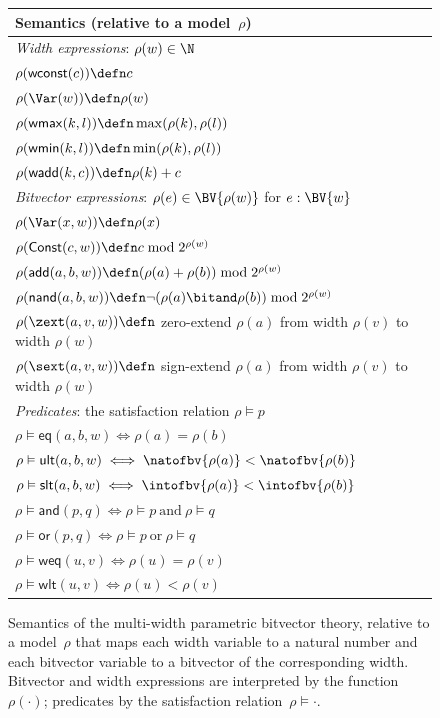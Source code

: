 \begin{figure}[htbp]
\centering
\small
\setlength{\tabcolsep}{3pt}
\renewcommand{\arraystretch}{1.2}
\begin{tabular}{@{}p{12.5cm}@{}}
\toprule
\textbf{Semantics} (relative to a model~$\rho$) \\
\midrule
\textit{Width expressions}: $\rho(w) \in \N$ \\[2pt]
\rowcolor{black!10!white}
$\rho(\mathsf{wconst}(c)) \defn c$ \\
$\rho(\Var(w)) \defn \rho(w)$ \\
\rowcolor{black!10!white}
$\rho(\mathsf{wmax}(k, l)) \defn \max(\rho(k), \rho(l))$ \\
$\rho(\mathsf{wmin}(k, l)) \defn \min(\rho(k), \rho(l))$ \\
\rowcolor{black!10!white}
$\rho(\mathsf{wadd}(k, c)) \defn \rho(k) + c$ \\[4pt]
\midrule
\textit{Bitvector expressions}: $\rho(e) \in \BV{\rho(w)}$ for $e : \BV{w}$ \\[2pt]
\rowcolor{black!10!white}
$\rho(\Var(x, w)) \defn \rho(x)$ \\
$\rho(\mathsf{Const}(c, w)) \defn c \bmod 2^{\rho(w)}$ \\
\rowcolor{black!10!white}
$\rho(\mathsf{add}(a, b, w)) \defn (\rho(a) + \rho(b)) \bmod 2^{\rho(w)}$ \\
$\rho(\mathsf{nand}(a, b, w)) \defn \lnot(\rho(a) \bitand \rho(b)) \bmod 2^{\rho(w)}$ \\
\rowcolor{black!10!white}
$\rho(\zext(a, v, w)) \defn$ zero-extend $\rho(a)$ from width $\rho(v)$ to width $\rho(w)$ \\
$\rho(\sext(a, v, w)) \defn$ sign-extend $\rho(a)$ from width $\rho(v)$ to width $\rho(w)$ \\[4pt]
\midrule
\textit{Predicates}: the satisfaction relation $\rho \vDash p$ \\[2pt]
\rowcolor{black!10!white}
$\rho \vDash \mathsf{eq}(a, b, w) \iff \rho(a) = \rho(b)$ \\
$\rho \vDash \mathsf{ult}(a, b, w) \iff \natofbv{\rho(a)} < \natofbv{\rho(b)}$ \\
\rowcolor{black!10!white}
$\rho \vDash \mathsf{slt}(a, b, w) \iff \intofbv{\rho(a)} < \intofbv{\rho(b)}$ \\
$\rho \vDash \mathsf{and}(p, q) \iff \rho \vDash p \ \text{and}\ \rho \vDash q$ \\
\rowcolor{black!10!white}
$\rho \vDash \mathsf{or}(p, q) \iff \rho \vDash p \ \text{or}\ \rho \vDash q$ \\
$\rho \vDash \mathsf{weq}(u, v) \iff \rho(u) = \rho(v)$ \\
\rowcolor{black!10!white}
$\rho \vDash \mathsf{wlt}(u, v) \iff \rho(u) < \rho(v)$ \\
\bottomrule
\end{tabular}
\caption{Semantics of the multi-width parametric bitvector theory, relative to a
model~$\rho$ that maps each width variable to a natural number and each bitvector
variable to a bitvector of the corresponding width. Bitvector and width
expressions are interpreted by the function~$\rho(\cdot)$; predicates by the
satisfaction relation~$\rho \vDash \cdot$.}
\label{mwbv:fig:semantics}
\end{figure}

